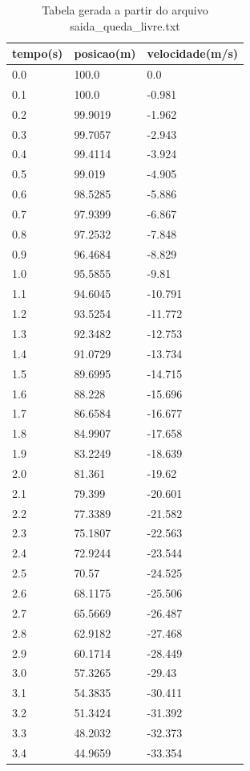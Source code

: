 \begin{table}
\caption{Tabela gerada a partir do arquivo saida\_queda\_livre.txt}
\label{tab:saida_queda_livre}
\begin{tabular}{lll}
\toprule
tempo(s) & posicao(m) & velocidade(m/s) \\
\midrule
0.0 & 100.0 & 0.0 \\
0.1 & 100.0 & -0.981 \\
0.2 & 99.9019 & -1.962 \\
0.3 & 99.7057 & -2.943 \\
0.4 & 99.4114 & -3.924 \\
0.5 & 99.019 & -4.905 \\
0.6 & 98.5285 & -5.886 \\
0.7 & 97.9399 & -6.867 \\
0.8 & 97.2532 & -7.848 \\
0.9 & 96.4684 & -8.829 \\
1.0 & 95.5855 & -9.81 \\
1.1 & 94.6045 & -10.791 \\
1.2 & 93.5254 & -11.772 \\
1.3 & 92.3482 & -12.753 \\
1.4 & 91.0729 & -13.734 \\
1.5 & 89.6995 & -14.715 \\
1.6 & 88.228 & -15.696 \\
1.7 & 86.6584 & -16.677 \\
1.8 & 84.9907 & -17.658 \\
1.9 & 83.2249 & -18.639 \\
2.0 & 81.361 & -19.62 \\
2.1 & 79.399 & -20.601 \\
2.2 & 77.3389 & -21.582 \\
2.3 & 75.1807 & -22.563 \\
2.4 & 72.9244 & -23.544 \\
2.5 & 70.57 & -24.525 \\
2.6 & 68.1175 & -25.506 \\
2.7 & 65.5669 & -26.487 \\
2.8 & 62.9182 & -27.468 \\
2.9 & 60.1714 & -28.449 \\
3.0 & 57.3265 & -29.43 \\
3.1 & 54.3835 & -30.411 \\
3.2 & 51.3424 & -31.392 \\
3.3 & 48.2032 & -32.373 \\
3.4 & 44.9659 & -33.354 \\

\end{tabular}
\end{table}
